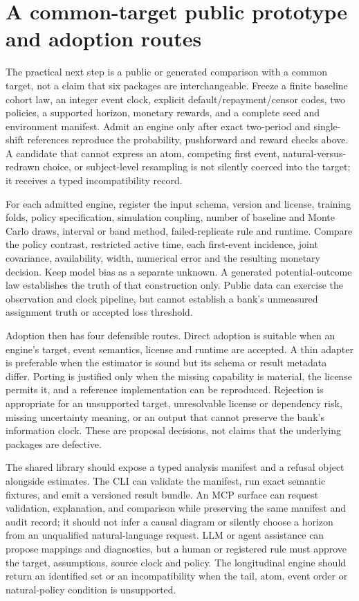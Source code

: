 \section{A common-target public prototype and adoption routes}
\label{exec17:s5-adoption}

The practical next step is a public or generated comparison with a common
target, not a claim that six packages are interchangeable. Freeze a finite
baseline cohort law, an integer event clock, explicit default/repayment/censor
codes, two policies, a supported horizon, monetary rewards, and a complete
seed and environment manifest. Admit an engine only after exact two-period and
single-shift references reproduce the probability, pushforward and reward
checks above. A candidate that cannot express an atom, competing first event,
natural-versus-redrawn choice, or subject-level resampling is not silently
coerced into the target; it receives a typed incompatibility record.

For each admitted engine, register the input schema, version and license,
training folds, policy specification, simulation coupling, number of baseline
and Monte Carlo draws, interval or band method, failed-replicate rule and
runtime. Compare the policy contrast, restricted active time, each first-event
incidence, joint covariance, availability, width, numerical error and the
resulting monetary decision. Keep model bias as a separate unknown. A generated
potential-outcome law establishes the truth of that construction only. Public
data can exercise the observation and clock pipeline, but cannot establish a
bank's unmeasured assignment truth or accepted loss threshold.

Adoption then has four defensible routes. Direct adoption is suitable when an
engine's target, event semantics, license and runtime are accepted. A thin
adapter is preferable when the estimator is sound but its schema or result
metadata differ. Porting is justified only when the missing capability is
material, the license permits it, and a reference implementation can be
reproduced. Rejection is appropriate for an unsupported target, unresolvable
license or dependency risk, missing uncertainty meaning, or an output that
cannot preserve the bank's information clock. These are proposal decisions,
not claims that the underlying packages are defective.

The shared library should expose a typed analysis manifest and a refusal
object alongside estimates. The CLI can validate the manifest, run exact
semantic fixtures, and emit a versioned result bundle. An MCP surface can
request validation, explanation, and comparison while preserving the same
manifest and audit record; it should not infer a causal diagram or silently
choose a horizon from an unqualified natural-language request. LLM or agent
assistance can propose mappings and diagnostics, but a human or registered
rule must approve the target, assumptions, source clock and policy. The
longitudinal engine should return an identified set or an incompatibility when
the tail, atom, event order or natural-policy condition is unsupported.

